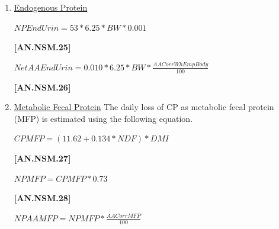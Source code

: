 \documentclass{article}
\begin{document}
\begin{refsection}
\begin{itemize}
\begin{enumerate}
        \item \underline {Endogenous Protein}
        \vspace{0.2cm}

\begin{center}
    \(NPEndUrin = 53 * 6.25 * BW * 0.001\)
\end{center}

\vspace{0.5cm}
            {\raggedleft \textbf{[AN.NSM.25]}\par}
            \vspace{0.5cm}

        \vspace{0.2cm}

\begin{center}
    \(NetAAEndUrin = 0.010 * 6.25 * BW * \frac{AACorrWhEmpBody}{100}\)
\end{center}

\vspace{0.5cm}
            {\raggedleft \textbf{[AN.NSM.26]}\par}
            \vspace{0.5cm}
            
        \item \underline {Metabolic Fecal Protein}
        The daily loss of CP as metabolic fecal protein (MFP) is estimated using the following equation.
        \vspace{0.2cm}

\begin{center}
    \(CPMFP = (11.62 + 0.134 * NDF) * DMI\)
\end{center}

\vspace{0.5cm}
            {\raggedleft \textbf{[AN.NSM.27]}\par}
            \vspace{0.5cm}

\begin{center}
    \(NPMFP = CPMFP * 0.73\)
\end{center}

\vspace{0.5cm}
            {\raggedleft \textbf{[AN.NSM.28]}\par}
            \vspace{0.5cm}

\begin{center}
    \(NPAAMFP = NPMFP * \frac{AACorrMFP}{100}\)
\end{center}


\end{enumerate}
\end{itemize}
\end{refsection}
\end{document}
